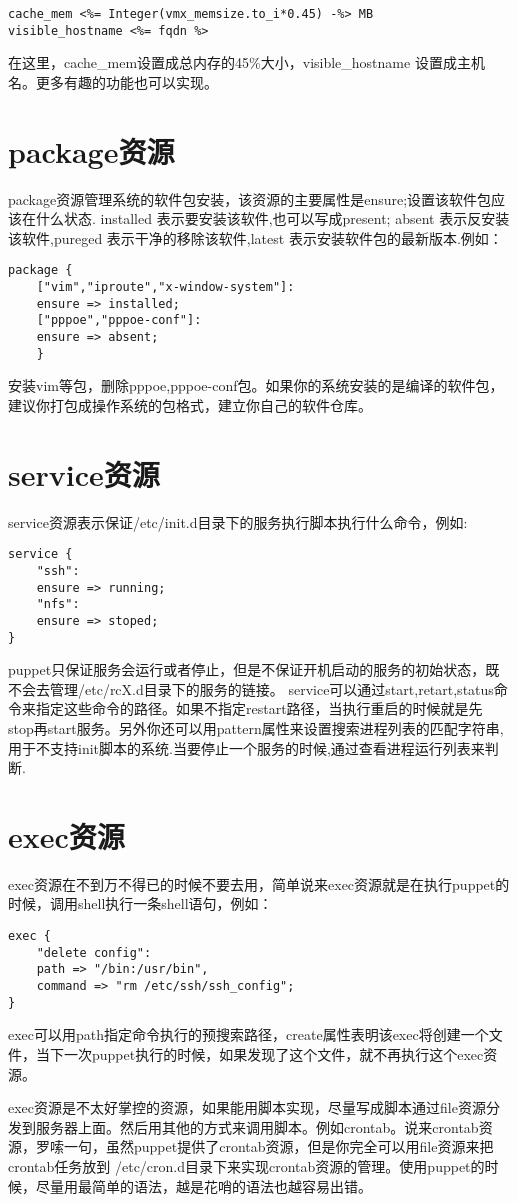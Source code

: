 \msyh \begin{lstlisting}
cache_mem <%= Integer(vmx_memsize.to_i*0.45) -%> MB
visible_hostname <%= fqdn %>
\end{lstlisting} \song
在这里，cache\_mem设置成总内存的45\%大小，visible\_hostname 设置成主机名。更多有趣的功能也可以实现。
\section{\msyh package资源}
package资源管理系统的软件包安装，该资源的主要属性是ensure;设置该软件包应该在什么状态. installed 表示要安装该软件,也可以写成present; absent 表示反安装该软件,pureged 表示干净的移除该软件,latest 表示安装软件包的最新版本.例如：
\msyh \begin{lstlisting}
package {
    ["vim","iproute","x-window-system"]:
    ensure => installed;
    ["pppoe","pppoe-conf"]:
    ensure => absent;
    }
\end{lstlisting} \song
安装vim等包，删除pppoe,pppoe-conf包。如果你的系统安装的是编译的软件包，建议你打包成操作系统的包格式，建立你自己的软件仓库。
\section{\msyh service资源}
service资源表示保证/etc/init.d目录下的服务执行脚本执行什么命令，例如:
\msyh \begin{lstlisting}
service {
	"ssh":
	ensure => running;
	"nfs":
	ensure => stoped;
}
\end{lstlisting} \song
puppet只保证服务会运行或者停止，但是不保证开机启动的服务的初始状态，既不会去管理/etc/rcX.d目录下的服务的链接。
service可以通过start,retart,status命令来指定这些命令的路径。如果不指定restart路径，当执行重启的时候就是先 stop再start服务。另外你还可以用pattern属性来设置搜索进程列表的匹配字符串,用于不支持init脚本的系统.当要停止一个服务的时候,通过查看进程运行列表来判断.

\section{\msyh exec资源}
exec资源在不到万不得已的时候不要去用，简单说来exec资源就是在执行puppet的时候，调用shell执行一条shell语句，例如：
\msyh \begin{lstlisting}
exec {
	"delete config":
	path => "/bin:/usr/bin",
	command => "rm /etc/ssh/ssh_config";
}
\end{lstlisting} \song
exec可以用path指定命令执行的预搜索路径，create属性表明该exec将创建一个文件，当下一次puppet执行的时候，如果发现了这个文件，就不再执行这个exec资源。\par
exec资源是不太好掌控的资源，如果能用脚本实现，尽量写成脚本通过file资源分发到服务器上面。然后用其他的方式来调用脚本。例如crontab。说来crontab资源，罗嗦一句，虽然puppet提供了crontab资源，但是你完全可以用file资源来把 crontab任务放到 /etc/cron.d目录下来实现crontab资源的管理。使用puppet的时候，尽量用最简单的语法，越是花哨的语法也越容易出错。

